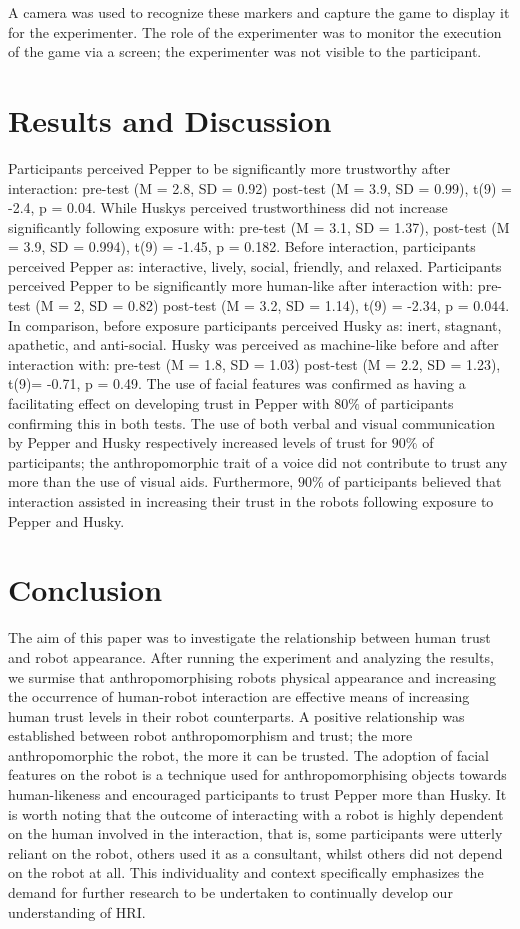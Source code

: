 \documentclass[letterpaper]{article} %
\begin{document}
A camera was used to recognize these markers and capture the game to display it for the experimenter. The role of the experimenter was to monitor the execution of the game via a screen; the experimenter was not visible to the participant.
\vspace{-3.59mm}
\section{Results and Discussion  }
Participants perceived Pepper to be significantly more trustworthy after interaction: pre-test (M = 2.8, SD = 0.92) post-test (M = 3.9, SD = 0.99), t(9) = -2.4, p = 0.04. While Huskys perceived trustworthiness did not increase significantly following exposure with: pre-test (M = 3.1, SD = 1.37), post-test (M = 3.9, SD = 0.994), t(9) = -1.45, p = 0.182. Before interaction, participants perceived Pepper as: interactive, lively, social, friendly, and relaxed. Participants perceived Pepper to be significantly more human-like after interaction with: pre-test (M = 2, SD = 0.82) post-test (M = 3.2, SD = 1.14), t(9) = -2.34, p = 0.044. In comparison, before exposure participants perceived Husky as: inert, stagnant, apathetic, and anti-social. Husky was perceived as machine-like before and after interaction with: pre-test (M = 1.8, SD = 1.03) post-test (M = 2.2, SD = 1.23), t(9)= -0.71, p = 0.49. The use of facial features was confirmed as having a facilitating effect on developing trust in Pepper with $80\%$ of participants confirming this in both tests. The use of both verbal and visual communication by Pepper and Husky respectively increased levels of trust for $90\%$ of participants; the anthropomorphic trait of a voice did not contribute to trust any more than the use of visual aids. Furthermore, $90\%$ of participants believed that interaction assisted in increasing their trust in the robots following exposure to Pepper and Husky.
\vspace{-3.27mm}
\section{Conclusion}
The aim of this paper was to investigate the relationship between human trust and robot appearance. After running the experiment and analyzing the results, we surmise that anthropomorphising robots physical appearance and increasing the occurrence of human-robot interaction are effective means of increasing human trust levels in their robot counterparts. A positive relationship was established between robot anthropomorphism and trust; the more anthropomorphic the robot, the more it can be trusted. The adoption of facial features on the robot is a technique used for anthropomorphising objects towards human-likeness and encouraged participants to trust Pepper more than Husky. It is worth noting that the outcome of interacting with a robot is highly dependent on the human involved in the interaction, that is, some participants were utterly reliant on the robot, others used it as a consultant, whilst others did not depend on the robot at all. This individuality and context specifically emphasizes the demand for further research to be undertaken to continually develop our understanding of HRI.
\end{document}
